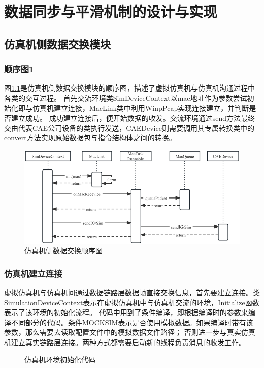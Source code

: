 \chapter{数据同步与平滑机制的设计与实现}
\section{仿真机侧数据交换模块}
\subsection{顺序图1}
图\ref{seq1}是仿真机侧数据交换模块的顺序图，描述了虚拟仿真机与仿真机沟通过程中各类的交互过程。
首先交流环境类SimDeviceContext以mac地址作为参数尝试初始化即与仿真机建立连接，MacLink类中利用WinpPcap实现连接建立，并判断是否建立成功。
成功建立连接后，便开始数据的收发。交流环境通过send方法最终交由代表CAE公司设备的类执行发送，CAEDevice则需要调用其专属转换类中的convert方法实现原始数据包与指令结构体之间的转换。
\begin{figure}[h!]

    \begin{center}
        \includegraphics[width=\textwidth]{pictures/sequence1.pdf}
        \caption{仿真机侧数据交换顺序图}
        \label{seq1}
    \end{center}
\end{figure}
\subsection{仿真机建立连接}
虚拟仿真机与仿真机间通过数据链路层数据帧直接交换信息，首先要建立连接。类SimulationDeviceContext表示在虚拟仿真机中与仿真机交流的环境，Initialize函数表示了该环境的初始化流程。
代码中用到了条件编译，即根据编译时的参数来编译不同部分的代码。条件MOCKSIM表示是否使用模拟数据。如果编译时带有该参数，那么需要去读取配置文件中的模拟数据文件路径；
否则进一步与真实仿真机建立真实链路层连接。两种方式都需要启动新的线程负责消息的收发工作。
\begin{figure}[h!]
    \centering
     
    \caption{仿真机环境初始化代码}
    \label{code1}
\end{figure}

